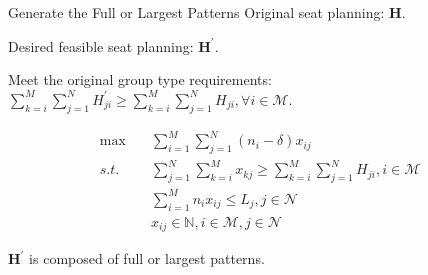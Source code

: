   \begin{frame}{Generate the Full or Largest Patterns}
    \small
    Original seat planning: $\bm{H}$.

    Desired feasible seat planning: $\bm{H}^{\prime}$.
    
    Meet the original group type requirements: $\sum_{k=i}^{M} \sum_{j=1}^{N} H^{'}_{ji} \geq \sum_{k=i}^{M} \sum_{j=1}^{N} H_{ji}, \forall i \in \mathcal{M}$.

    \begin{equation}\label{improve_seat}
      \begin{aligned}
      \max \quad & \sum_{i=1}^{M} \sum_{j=1}^{N} (n_i-\delta)  x_{ij} \\
      s.t. \quad & \sum_{j=1}^{N} \sum_{k=i}^{M} x_{kj} \geq  \sum_{k=i}^{M} \sum_{j=1}^{N} H_{ji}, i \in \mathcal{M} \\
      & \sum_{i=1}^{M} n_{i} x_{ij} \leq L_{j}, j \in \mathcal{N} \\
      & x_{ij} \in \mathbb{N}, i \in \mathcal{M}, j \in \mathcal{N}
      \end{aligned}
    \end{equation}

    $\bm{H}^{\prime}$ is composed of full or largest patterns.
  \end{frame}

  